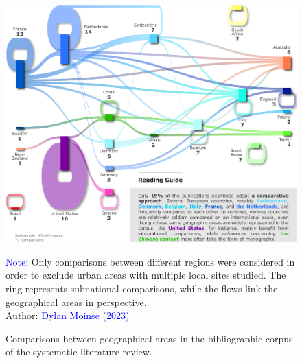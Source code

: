 \begin{refsegment}
\begin{figure}[h!]\vspace*{4pt}
    \caption{Comparisons between geographical areas in the bibliographic corpus of the systematic literature review.}
    \label{fig-chap2:comparaisons-internationales-rsl}
    \centerline{\includegraphics[width=1\columnwidth]{src/Figures/Chap-2/EN_RSL_Comparaisons_internationales.pdf}}
    \vspace{5pt}
    \begin{flushright}\scriptsize{
    \textcolor{blue}{Note:} Only comparisons between different regions were considered in order to exclude urban areas with multiple local sites studied. The ring represents subnational comparisons, while the flows link the geographical areas in perspective.
    \\
    Author: \textcolor{blue}{Dylan Moinse (2023)}
    }\end{flushright}
\end{figure}


\end{refsegment}

